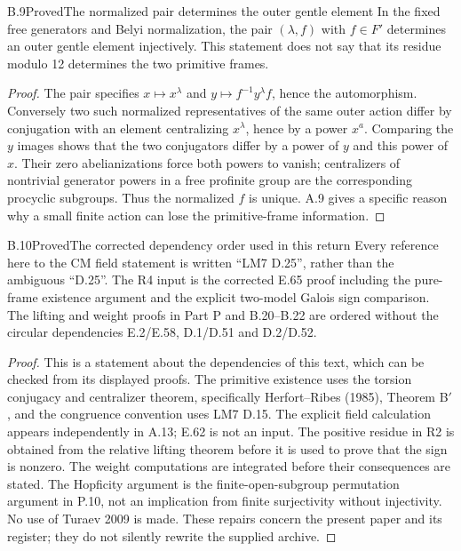 \begin{statement}{B.9}{Proved}{The normalized pair determines the outer gentle element}
In the fixed free generators and Belyi normalization,
the pair $(\lambda,f)$ with $f\in F'$ determines
an outer gentle element injectively. This statement
does not say that its residue modulo 12 determines
the two primitive frames.
\end{statement}
\begin{proof}
The pair specifies $x\mapsto x^\lambda$ and
$y\mapsto f^{-1}y^\lambda f$, hence the automorphism.
Conversely two such normalized representatives of
the same outer action differ by conjugation with
an element centralizing $x^\lambda$, hence by a
power $x^a$. Comparing the $y$ images shows that
the two conjugators differ by a power of $y$ and
this power of $x$. Their zero abelianizations
force both powers to vanish; centralizers of
nontrivial generator powers in a free profinite
group are the corresponding procyclic subgroups.
Thus the normalized $f$ is unique. A.9 gives a
specific reason why a small finite action can lose
the primitive-frame information.
\end{proof}

\begin{statement}{B.10}{Proved}{The corrected dependency order used in this return}
Every reference here to the CM field statement is
written ``LM7 D.25'', rather than the ambiguous
``D.25''. The R4 input is the corrected E.65 proof
including the pure-frame existence argument and
the explicit two-model Galois sign comparison.
The lifting and weight proofs in Part P and B.20--B.22
are ordered without the circular dependencies
E.2/E.58, D.1/D.51 and D.2/D.52.
\end{statement}
\begin{proof}
This is a statement about the dependencies of this
text, which can be checked from its displayed
proofs. The primitive existence uses the torsion
conjugacy and centralizer theorem, specifically
Herfort--Ribes (1985), Theorem B$'$, and the
congruence convention uses LM7 D.15. The explicit
field calculation appears independently in A.13;
E.62 is not an input. The positive residue in R2
is obtained from the relative lifting theorem
before it is used to prove that the sign is nonzero.
The weight computations are integrated before
their consequences are stated. The Hopficity
argument is the finite-open-subgroup permutation
argument in P.10, not an implication from finite
surjectivity without injectivity. No use of Turaev
2009 is made. These repairs concern the present
paper and its register; they do not silently
rewrite the supplied archive.
\end{proof}
